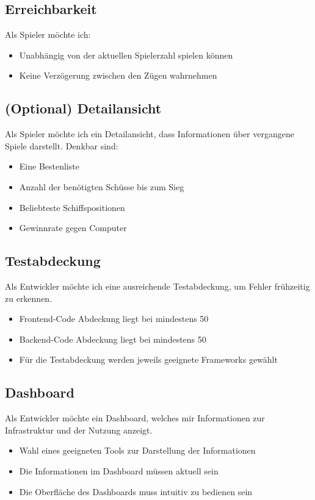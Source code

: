 \documentclass[a4paper, 10pt, conference]{IEEEtran}
\begin{document}
\subsection{Erreichbarkeit}
Als Spieler möchte ich:
\begin{itemize}
	\item Unabhängig von der aktuellen Spielerzahl spielen können
	\item Keine Verzögerung zwischen den Zügen wahrnehmen
\end{itemize}

\subsection{(Optional) Detailansicht}
Als Spieler möchte ich ein Detailansicht, dass Informationen über vergangene Spiele darstellt. Denkbar sind:
\begin{itemize}
	\item Eine Bestenliste
	\item Anzahl der benötigten Schüsse bis zum Sieg
	\item Beliebteste Schiffspositionen
	\item Gewinnrate gegen Computer
\end{itemize}

\subsection{Testabdeckung}
Als Entwickler möchte ich eine ausreichende Testabdeckung, um Fehler frühzeitig zu erkennen.
\begin{itemize}
	\item Frontend-Code Abdeckung liegt bei mindestens 50%
	\item Backend-Code Abdeckung liegt bei mindestens 50%
	\item Für die Testabdeckung werden jeweils geeignete Frameworks gewählt
\end{itemize}

\subsection{Dashboard}
Als Entwickler möchte ein Dashboard, welches mir Informationen zur Infrastruktur und der Nutzung anzeigt.
\begin{itemize}
	\item Wahl eines geeigneten Tools zur Darstellung der Informationen
	\item Die Informationen im Dashboard müssen aktuell sein
	\item Die Oberfläche des Dashboards muss intuitiv zu bedienen sein
\end{itemize}
\end{document}
